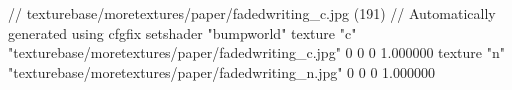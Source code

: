 // texturebase/moretextures/paper/fadedwriting_c.jpg (191)
// Automatically generated using cfgfix
setshader "bumpworld"
texture "c" "texturebase/moretextures/paper/fadedwriting_c.jpg" 0 0 0 1.000000
texture "n" "texturebase/moretextures/paper/fadedwriting_n.jpg" 0 0 0 1.000000
